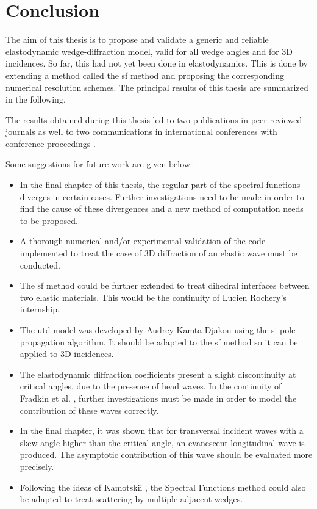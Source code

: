 \chapter*{Conclusion}

The aim of this thesis is to propose and validate a generic and reliable elastodynamic wedge-diffraction model, valid for all wedge angles and for 3D incidences. So far, this had not yet been done in elastodynamics. This is done by extending a method called the \acrfull{sf} method and proposing the corresponding numerical resolution schemes. The principal results of this thesis are summarized in the following.



The results obtained during this thesis led to two publications in peer-reviewed journals \cite{article, articleelasto} as well to two communications in international conferences with conference proceedings \cite{DD2018,AFPAC}.

Some suggestions for future work are given below :
\begin{itemize}
\item In the final chapter of this thesis, the regular part of the spectral functions diverges in certain cases. Further investigations need to be made in order to find the cause of these divergences and a new method of computation needs to be proposed.
\item A thorough numerical and/or experimental validation of the code implemented to treat the case of 3D diffraction of an elastic wave must be conducted.
\item The \acrlong{sf} method could be further extended to treat dihedral interfaces between two elastic materials. This would be the continuity of Lucien Rochery's internship.
\item The \acrshort{utd} model was developed by Audrey Kamta-Djakou \cite{AKDthese} using the \acrfull{si} pole propagation algorithm. It should be adapted to the \acrshort{sf} method so it can be applied to 3D incidences.
\item The elastodynamic diffraction coefficients present a slight discontinuity at critical angles, due to the presence of head waves. In the continuity of Fradkin et al. \cite{FradkinDarmon}, further investigations must be made in order to model the contribution of these waves correctly.
\item In the final chapter, it was shown that for transversal incident waves with a skew angle higher than the critical angle, an evanescent longitudinal wave is produced. The asymptotic contribution of this wave should be evaluated more precisely.
\item Following the ideas of Kamotskii \cite{Kamotski2}, the Spectral Functions method could also be adapted to treat scattering by multiple adjacent wedges.
\end{itemize}